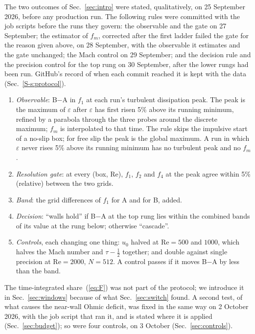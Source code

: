 \documentclass[aip,pop,reprint,amsmath,amssymb,superscriptaddress,floatfix]{revtex4-2}
\newcommand{\Rey}{\mathrm{Re}}
\newcommand{\eps}{\varepsilon}
\begin{document}
The two outcomes of Sec.~\ref{sec:intro} were stated, qualitatively, on 25 September
2026, before any production run. The following rules were committed with the job
scripts before the runs they govern: the observable and the gate on 27 September;
the estimator of $f_m$, corrected after the first ladder failed the gate for the
reason given above, on 28 September, with the observable it estimates and the gate
unchanged; the Mach control on 29 September; and the decision rule and the
precision control for the top rung on 30 September, after the lower rungs had been
run. GitHub's record of when each
commit reached it is kept with the data (Sec.~\ref{S-s:protocol}).
\begin{enumerate}
\item \emph{Observable}: B$-$A in $f_1$ at each run's turbulent dissipation peak. The
peak is the maximum of $\eps$ after $\eps$ has first risen 5\% above its running
minimum, refined by a parabola through the three probes around the discrete maximum;
$f_m$ is interpolated to that time. The rule skips the impulsive start of a no-slip
box; for free slip the peak is the global maximum. A run in which $\eps$ never rises
5\% above its running minimum has no turbulent peak and no $f_m$.
\item \emph{Resolution gate}: at every (box, $\Rey$), $f_1$, $f_2$ and $f_4$ at the
peak agree within 5\% (relative) between the two grids.
\item \emph{Band}: the grid differences of $f_1$ for A and for B, added.
\item \emph{Decision}: ``walls hold'' if B$-$A at the top rung lies within the combined
bands of its value at the rung below; otherwise ``cascade''.
\item \emph{Controls}, each changing one thing: $u_0$ halved at $\Rey=500$ and $1000$,
which halves the Mach number and $\tau-\frac12$ together; and double against single
precision at $\Rey=2000$, $N=512$. A control passes if it moves B$-$A by less than the
band.
\end{enumerate}
The time-integrated share~(\ref{eq:F}) was not part of the protocol; we introduce it
in Sec.~\ref{sec:windows} because of what Sec.~\ref{sec:switch} found. A second test,
of what causes the near-wall Ohmic deficit, was fixed in the same way on 2 October
2026, with the job script that ran it, and is stated where it is applied
(Sec.~\ref{sec:budget}); so were four controls, on 3 October
(Sec.~\ref{sec:controls}).

\end{document}

